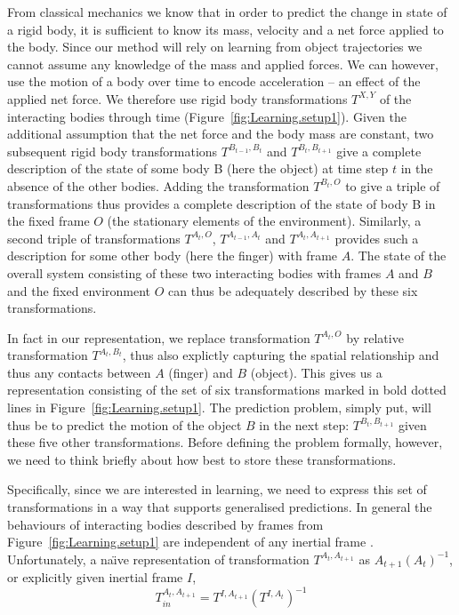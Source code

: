 From classical mechanics we know that in order to predict the change
in state of a rigid body, it is sufficient to know its mass, velocity
and a net force applied to the body.  Since our method will rely on
learning from object trajectories we cannot assume any knowledge of
the mass and applied forces. We can however, use the motion of a body over time to encode acceleration -- an effect of the applied net
force. We therefore use rigid body transformations $T^{X,Y}$ of the interacting bodies through time (Figure~\ref{fig:Learning.setup1}). Given the additional assumption that the net force and the body mass are constant, two subsequent rigid body transformations $T^{B_{t-1},
  B_{t}}$ and $T^{B_{t},B_{t+1}}$ give a complete description of the
state of some body B (here the object) at time step $t$ in the absence
of the other bodies.  Adding the transformation $T^{B_t, O}$ to give a
triple of transformations thus provides a complete description of the
state of body B in the fixed frame $O$ (the stationary elements of the
environment).  Similarly, a second triple of transformations $T^{A_t,
  O}$, $T^{A_{t-1}, A_{t}}$ and $T^{A_{t}, A_{t+1}}$ provides such a
description for some other body (here the finger) with frame $A$. 
The state of the overall system consisting of these two interacting
bodies with frames $A$ and $B$ and the fixed environment $O$ can
thus be adequately described by these six transformations.

In fact in our representation, we replace transformation $T^{A_t, O}$ by relative transformation $T^{A_t, B_t}$, thus also explictly capturing the spatial relationship and thus any contacts between $A$ (finger) and $B$ (object). This gives us a representation consisting of the set of six transformations marked in bold dotted lines in Figure~\ref{fig:Learning.setup1}. The prediction problem, simply put, will thus be to predict the motion of the object $B$ in the next step: $T^{B_t,B_{t+1}}$ given these five other transformations. Before defining the problem formally, however, we need to think briefly about how best to store these transformations.

Specifically, since we are interested in learning, we need to express this set of transformations in a way that supports generalised predictions. In general the behaviours of interacting bodies described by frames from Figure~\ref{fig:Learning.setup1} are independent of any inertial frame \cite{kopicki_prediction_2010}. Unfortunately, a na\"{\i}ve representation of transformation $T^{A_{t}, A_{t+1}}$ as $A_{t+1}(A_{t})^{-1}$, or explicitly given inertial frame $I$,
\begin{equation}
T_{in}^{A_{t}, A_{t+1}} = T^{I, A_{t+1}} (T^{I, A_{t}})^{-1}
\label{eq:Learning.In1}
\end{equation}

